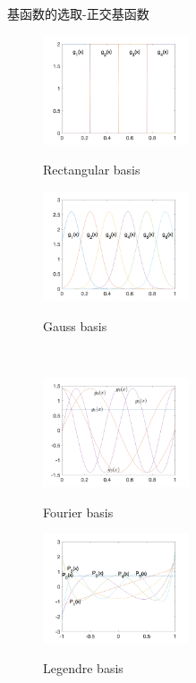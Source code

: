 \documentclass{beamer}
\begin{document}
		\begin{frame}{基函数的选取-正交基函数}
			\begin{figure}
				\begin{minipage}{0.45\linewidth}
					\centerline{\includegraphics[width=1.7in]{images/function_basis_rect}}
					\centerline{\tiny Rectangular basis}
				\end{minipage}
			\hfill
				\begin{minipage}{0.45\linewidth}
					\centerline{\includegraphics[width=1.7in]{images/function_basis_gauss}}
					\centerline{\tiny Gauss basis}
				\end{minipage}\\
			\begin{minipage}{0.45\linewidth}
				\centerline{\includegraphics[width=1.7in]{images/function_basis_four}}
				\centerline{\tiny Fourier basis}
			\end{minipage}
		\hfill
			\begin{minipage}{0.45\linewidth}
				\centerline{\includegraphics[width=1.7in]{images/function_basis_legen}}
				\centerline{\tiny Legendre basis}
			\end{minipage}
			\end{figure}
		\end{frame}
\end{document}

